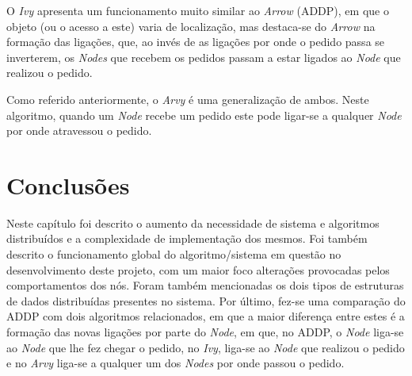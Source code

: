 O \emph{Ivy} apresenta um funcionamento muito similar ao \emph{Arrow} (\acs*{ADDP}), em que o objeto (ou o acesso a este) varia de localização, mas destaca-se do \emph{Arrow} na formação das ligações, que, ao invés de as ligações por onde o pedido passa se inverterem, os \emph{Nodes} que recebem os pedidos passam a estar ligados ao \emph{Node} que realizou o pedido.

Como referido anteriormente, o \emph{Arvy} é uma generalização de ambos. Neste algoritmo, quando um \emph{Node} recebe um pedido este pode ligar-se a qualquer \emph{Node} por onde atravessou o pedido.




\section{Conclusões}
\label{motivacao:sec:conclusao}
Neste capítulo foi descrito o aumento da necessidade de sistema e algoritmos distribuídos e a complexidade de implementação dos mesmos. Foi também descrito o funcionamento global do algoritmo/sistema em questão no desenvolvimento deste projeto, com um maior foco alterações provocadas pelos comportamentos dos nós. Foram também mencionadas os dois tipos de estruturas de dados distribuídas presentes no sistema. Por último, fez-se uma comparação do \acs*{ADDP} com dois algoritmos relacionados, em que a maior diferença entre estes é a formação das novas ligações por parte do \emph{Node}, em que, no \acs*{ADDP}, o \emph{Node} liga-se ao \emph{Node} que lhe fez chegar o pedido, no \emph{Ivy}, liga-se ao \emph{Node} que realizou o pedido e no \emph{Arvy} liga-se a qualquer um dos \emph{Nodes} por onde passou o pedido.

